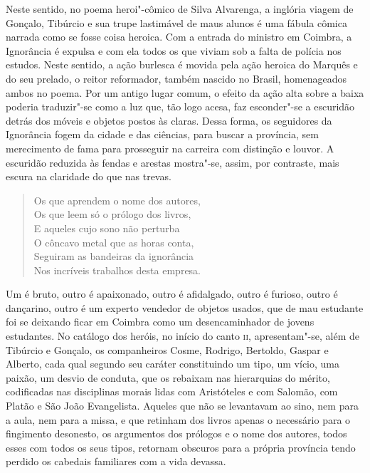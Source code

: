 Neste sentido, no poema heroi"-cômico de Silva Alvarenga, a inglória viagem de
Gonçalo, Tibúrcio e sua trupe lastimável de maus alunos é uma fábula cômica
narrada como se fosse coisa heroica.  Com a entrada do ministro em Coimbra, a
Ignorância é expulsa e com ela todos os que viviam sob a falta de polícia nos
estudos.  Neste sentido, a ação burlesca é movida pela ação heroica do Marquês e
do seu prelado, o reitor reformador, também nascido no Brasil, homenageados
ambos no poema. Por um antigo lugar comum, o efeito da ação alta sobre a baixa
poderia traduzir"-se como a luz que, tão logo acesa, faz esconder"-se a escuridão
detrás dos móveis e objetos postos às claras.  Dessa forma, os seguidores da
Ignorância fogem da cidade e das ciências, para buscar a província, sem
merecimento de fama para prosseguir na carreira com distinção e louvor. A
escuridão reduzida às fendas e arestas mostra"-se, assim, por contraste, mais
escura na claridade do que nas trevas.

\begin{verse}
Os que aprendem o nome dos autores, \\
Os que leem só o prólogo dos livros, \\
E aqueles cujo sono não perturba \\
O côncavo metal que as horas conta, \\
Seguiram as bandeiras da ignorância \\
Nos incríveis trabalhos desta empresa.
\end{verse}

Um é bruto, outro é apaixonado, outro é afidalgado, outro é furioso, outro é
dançarino, outro é um experto vendedor de objetos usados, que de mau estudante
foi se deixando ficar em Coimbra como um desencaminhador de jovens estudantes.
No catálogo dos heróis, no início do canto \textsc{ii}, apresentam"-se, além de
Tibúrcio e Gonçalo, os companheiros Cosme, Rodrigo, Bertoldo, Gaspar e Alberto,
cada qual segundo seu caráter constituindo um tipo, um vício, uma paixão, um
desvio de conduta, que os rebaixam nas hierarquias do mérito, codificadas nas
disciplinas morais lidas com Aristóteles e com Salomão, com Platão e São João
Evangelista.  Aqueles que não se levantavam ao sino, nem para a aula, nem para a
missa, e que retinham dos livros apenas o necessário para o fingimento
desonesto, os argumentos dos prólogos e o nome dos autores, todos esses com
todos os seus tipos, retornam obscuros para a própria província tendo perdido os
cabedais familiares com a vida devassa. 

